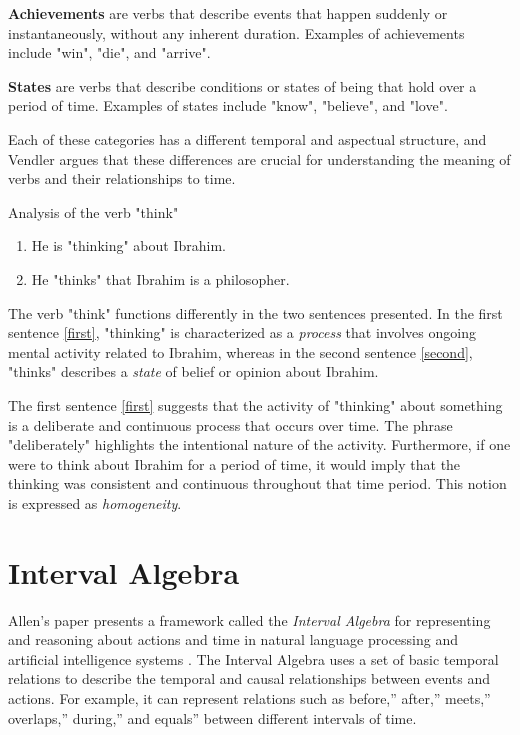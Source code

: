 \textbf{Achievements} are verbs that describe events that happen suddenly or instantaneously, without any inherent duration. Examples of achievements include "win", "die", and "arrive".


\textbf{States} are verbs that describe conditions or states of being that hold over a period of time. Examples of states include "know", "believe", and "love".

Each of these categories has a different temporal and aspectual structure, and Vendler argues that these differences are crucial for understanding the meaning of verbs and their relationships to time.



\begin{exmp} Analysis of the verb "think"
\begin{enumerate}
  \item He is "thinking" about Ibrahim. \label{first}
  \item He "thinks" that Ibrahim is a philosopher. \label{second}
\end{enumerate}

The verb "think" functions differently in the two sentences presented. In the first sentence \ref{first}, "thinking" is characterized as a \textit{process} that involves ongoing mental activity related to Ibrahim, whereas in the second sentence \ref{second}, "thinks" describes a \textit{state} of belief or opinion about Ibrahim.

 The first sentence \ref{first} suggests that the activity of "thinking" about something is a deliberate and continuous process that occurs over time. The phrase "deliberately" highlights the intentional nature of the activity. Furthermore, if one were to think about Ibrahim for a period of time, it would imply that the thinking was consistent and continuous throughout that time period. This notion is expressed as \textit{homogeneity}.
\end{exmp}


\section{Interval Algebra}

Allen's paper presents a framework called the \textit{Interval Algebra} for representing and reasoning about actions and time in natural language processing and artificial intelligence systems \cite{allen1984towards}. The Interval Algebra uses a set of basic temporal relations to describe the temporal and causal relationships between events and actions. For example, it can represent relations such as before,'' after,'' meets,'' overlaps,'' during,'' and equals'' between different intervals of time.

